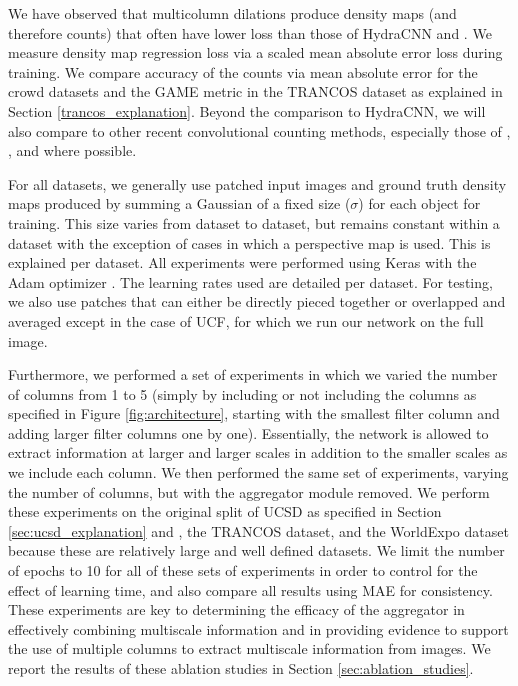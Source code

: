 \documentclass[10pt,twocolumn,letterpaper]{article}
\begin{document}
We have observed that multicolumn dilations produce density maps (and therefore counts) that often have lower loss than those of HydraCNN \cite{rubio2016} and \cite{zhang2016single}. We measure density map regression loss via a scaled mean absolute error loss during training. We compare accuracy of the counts via mean absolute error for the crowd datasets and the GAME metric in the TRANCOS dataset as explained in Section \ref{trancos_explanation}. Beyond the comparison to HydraCNN, we will also compare to other recent convolutional counting methods, especially those of \cite{segui2015}, \cite{walach2016}, and \cite{boominathan2016} where possible.

For all datasets, we generally use patched input images and ground truth density maps produced by summing a Gaussian of a fixed size (\(\sigma\)) for each object for training. This size varies from dataset to dataset, but remains constant within a dataset with the exception of cases in which a perspective map is used. This is explained per dataset. All experiments were performed using Keras with the Adam optimizer \cite{chollet2015keras}. The learning rates used are detailed per dataset. For testing, we also use patches that can either be directly pieced together or overlapped and averaged except in the case of UCF, for which we run our network on the full image.

Furthermore, we performed a set of experiments in which we varied the number of columns from 1 to 5 (simply by including or not including the columns as specified in Figure \ref{fig:architecture}, starting with the smallest filter column and adding larger filter columns one by one). Essentially, the network is allowed to extract information at larger and larger scales in addition to the smaller scales as we include each column. We then performed the same set of experiments, varying the number of columns, but with the aggregator module removed. We perform these experiments on the original split of UCSD as specified in Section \ref{sec:ucsd_explanation} and \cite{chan2008privacy}, the TRANCOS dataset, and the WorldExpo dataset because these are relatively large and well defined datasets. We limit the number of epochs to 10 for all of these sets of experiments in order to control for the effect of learning time, and also compare all results using MAE for consistency. These experiments are key to determining the efficacy of the aggregator in effectively combining multiscale information and in providing evidence to support the use of multiple columns to extract multiscale information from images. We report the results of these ablation studies in Section \ref{sec:ablation_studies}.
\end{document}
